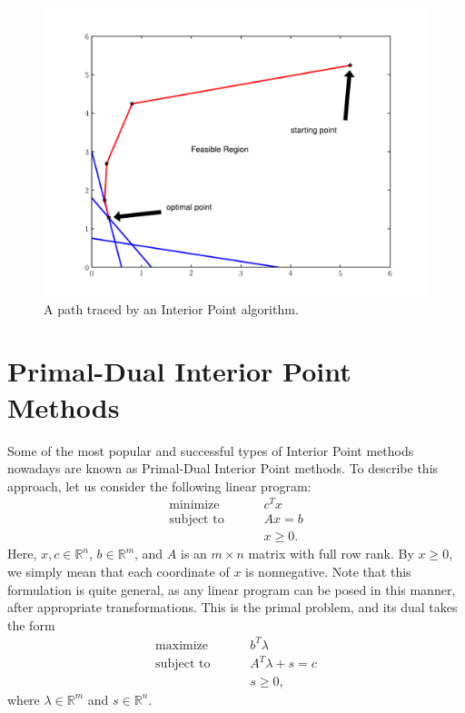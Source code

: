\begin{figure}
\centering
\includegraphics[width=\textwidth]{interiorPath.pdf}
\caption{A path traced by an Interior Point algorithm.}
\label{fig:intPath}
\end{figure}

\section*{Primal-Dual Interior Point Methods}
Some of the most popular and successful types of Interior Point methods nowadays are known as Primal-Dual Interior Point methods. To
describe this approach, let us consider the following linear program:
\begin{align*}
\text{minimize }\qquad &c^Tx\\
\text{subject to }\qquad &Ax = b\\
&x \geq 0.
\end{align*}
Here, $x, c \in \mathbb{R}^n$, $b \in \mathbb{R}^m$, and $A$ is an $m \times n$ matrix with full row rank. By $x \geq 0$, we
simply mean that each coordinate of $x$ is nonnegative. Note that this formulation is quite general, as any linear program can be
posed in this manner, after appropriate transformations. This is the primal problem, and its dual takes the form
\begin{align*}
\text{maximize }\qquad &b^T\lambda\\
\text{subject to }\qquad &A^T\lambda + s = c\\
&s \geq 0,
\end{align*}
where $\lambda \in \mathbb{R}^m$ and $s \in \mathbb{R}^n$.

